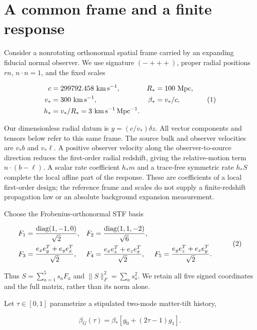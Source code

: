 \hypertarget{a-common-frame-and-a-finite-response}{%
\section{A common frame and a finite response}\label{a-common-frame-and-a-finite-response}}

Consider a nonrotating orthonormal spatial frame carried by an expanding fiducial normal observer. We use signature \((-+++ )\), proper radial positions \(r n\), \(n\cdot n=1\), and the fixed scales

\[
\begin{aligned}
c &= 299792.458\ {\rm km\,s^{-1}}, & R_* &= 100\ {\rm Mpc},\\
v_* &= 300\ {\rm km\,s^{-1}}, & \beta_* &= v_*/c,\\
h_* &= v_*/R_* = 3\ {\rm km\,s^{-1}\,Mpc^{-1}}.
\end{aligned}\tag{1}
\]

Our dimensionless radial datum is \(y=(c/v_*)\delta z\). All vector components and tensors below refer to this same frame. The source bulk and observer velocities are \(v_*b\) and \(v_*\ell\). A positive observer velocity along the observer-to-source direction reduces the first-order radial redshift, giving the relative-motion term \(n\cdot(b-\ell)\). A scalar rate coefficient \(h_*m\) and a trace-free symmetric rate \(h_*S\) complete the local affine part of the response. These are coefficients of a local first-order design; the reference frame and scales do not supply a finite-redshift propagation law or an absolute background expansion measurement.

Choose the Frobenius-orthonormal STF basis

\[
\begin{aligned}
F_1&={\operatorname{diag}(1,-1,0)\over\sqrt2},&
F_2&={\operatorname{diag}(1,1,-2)\over\sqrt6},\\
F_3&={e_xe_y^T+e_ye_x^T\over\sqrt2},&
F_4&={e_xe_z^T+e_ze_x^T\over\sqrt2},&
F_5&={e_ye_z^T+e_ze_y^T\over\sqrt2}.
\end{aligned}                                                        \tag{2}
\]

Thus \(S=\sum_{a=1}^5s_aF_a\) and \(\|S\|_F^2=\sum_a s_a^2\). We retain all five signed coordinates and the full matrix, rather than its norm alone.

Let \(\tau\in[0,1]\) parametrize a stipulated two-mode matter-tilt history,

\[
\beta_G(\tau)=\beta_*[g_0+(2\tau-1)g_1].                 \tag{3}
\]

